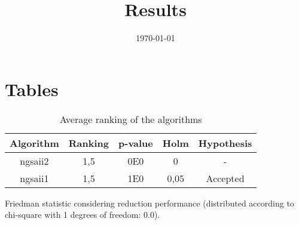 \documentclass{article}
\title{Results}
\author{}
\date{\today}
\begin{document}
\oddsidemargin 0in \topmargin 0in\maketitle

\section{Tables}
\begin{table}[!htp]
\centering
\begin{tabular}{c|c|c|c|c}
Algorithm&Ranking&p-value&Holm&Hypothesis\\
\hline
ngsaii2 & 1,5 & 0E0 & 0 & -\\
ngsaii1 & 1,5 & 1E0 & 0,05 & Accepted\\
\end{tabular}
\caption{Average ranking of the algorithms}
\end{table}


Friedman statistic considering reduction performance (distributed according to chi-square with 1 degrees of freedom: 0.0).
\end{document}
